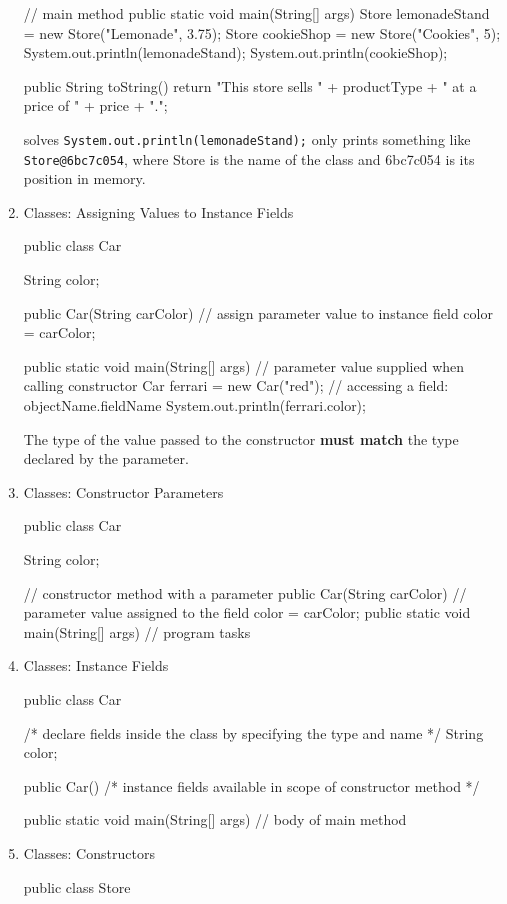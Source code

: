 \documentclass[a4paper,12pt]{article}
\begin{document}
\begin{enumerate}
\begin{javacode}
{  // main method
  public static void main(String[] args) {
    Store lemonadeStand = new Store("Lemonade", 3.75);
    Store cookieShop = new Store("Cookies", 5);
    System.out.println(lemonadeStand);
    System.out.println(cookieShop);
  }
  	
  public String toString() {
    return "This store sells " + productType + " at a price of " + price + ".";
  }
}
\end{javacode}
solves \verb|System.out.println(lemonadeStand);| only prints something like \verb|Store@6bc7c054|, where Store is the name of the class and 6bc7c054 is its position in memory.

\item Classes: Assigning Values to Instance Fields
\begin{javacode}
public class Car {
  String color;

  public Car(String carColor) {
    // assign parameter value to instance field
    color = carColor;
  }

  public static void main(String[] args) {
    // parameter value supplied when calling constructor
    Car ferrari = new Car("red");
		// accessing a field: objectName.fieldName
    System.out.println(ferrari.color);
  }
}
\end{javacode}
The type of the value passed to the constructor \textbf{must match} the type declared by the parameter.

\item Classes: Constructor Parameters
\begin{javacode}
public class Car {
  String color;

  // constructor method with a parameter
  public Car(String carColor) {
    // parameter value assigned to the field
    color = carColor;
  }
  public static void main(String[] args) {
    // program tasks
  }
}
\end{javacode}

\item Classes: Instance Fields
\begin{javacode}
public class Car {
  /*
  declare fields inside the class
  by specifying the type and name
  */
  String color;

  public Car() {
    /* 
    instance fields available in
    scope of constructor method
    */
  }

  public static void main(String[] args) {
    // body of main method
  }
}
\end{javacode}

\item Classes: Constructors
\begin{javacode}
public class Store {
  
}
\end{javacode}
\end{enumerate}
\end{document}
